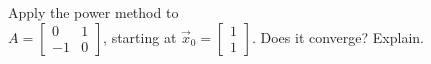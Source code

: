 \documentclass{ximera}
\begin{document}
\begin{problem}\label{prob:power_method_trouble}
Apply the power method to \\ $A = \left[ \begin{array}{rr}
0 & 1 \\
-1 & 0
\end{array}\right]$, starting at $\vec{x}_{0} = \left[ \begin{array}{rr}
1 \\
1
\end{array}\right]$. Does it converge? Explain.
\end{problem}
\end{document}
